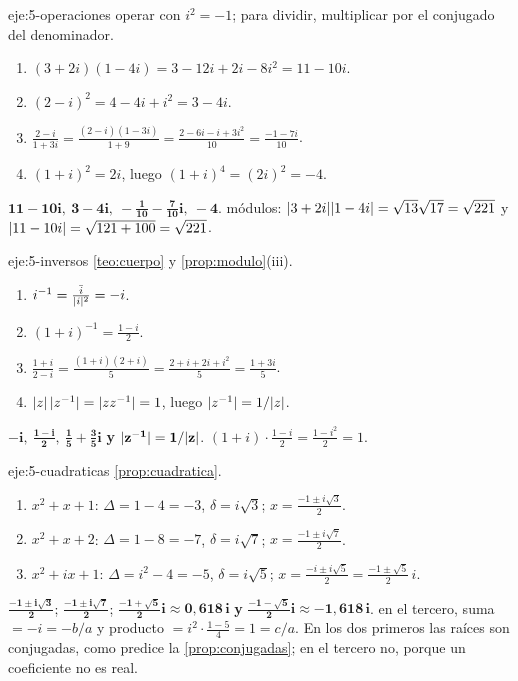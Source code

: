 \begin{solucion}{eje:5-operaciones}
\planteamiento operar con $i^{2}=-1$; para dividir, multiplicar por el conjugado del denominador.
\pasos
\begin{enumerate}[label=\arabic*.]
  \item $(3+2i)(1-4i)=3-12i+2i-8i^{2}=11-10i$.
  \item $(2-i)^{2}=4-4i+i^{2}=3-4i$.
  \item $\frac{2-i}{1+3i}=\frac{(2-i)(1-3i)}{1+9}=\frac{2-6i-i+3i^{2}}{10}=\frac{-1-7i}{10}$.
  \item $(1+i)^{2}=2i$, luego $(1+i)^{4}=(2i)^{2}=-4$.
\end{enumerate}
\resultado $\mathbf{11-10i,\ 3-4i,\ -\frac{1}{10}-\frac{7}{10}i,\ -4}$.
\comprobacion módulos: $\lvert3+2i\rvert\lvert1-4i\rvert=\sqrt{13}\sqrt{17}=\sqrt{221}$ y $\lvert11-10i\rvert=\sqrt{121+100}=\sqrt{221}$.
\end{solucion}

\begin{solucion}{eje:5-inversos}
\planteamiento \cref{teo:cuerpo} y \cref{prop:modulo}(iii).
\pasos
\begin{enumerate}[label=\arabic*.]
  \item $i^{-1}=\frac{\bar i}{\lvert i\rvert^{2}}=-i$.
  \item $(1+i)^{-1}=\frac{1-i}{2}$.
  \item $\frac{1+i}{2-i}=\frac{(1+i)(2+i)}{5}=\frac{2+i+2i+i^{2}}{5}=\frac{1+3i}{5}$.
  \item $\lvert z\rvert\,\lvert z^{-1}\rvert=\lvert zz^{-1}\rvert=1$, luego $\lvert z^{-1}\rvert=1/\lvert z\rvert$.
\end{enumerate}
\resultado $\mathbf{-i,\ \frac{1-i}{2},\ \frac15+\frac35i}$ \textbf{y} $\mathbf{\lvert z^{-1}\rvert=1/\lvert z\rvert}$.
\comprobacion $(1+i)\cdot\frac{1-i}{2}=\frac{1-i^{2}}{2}=1$.
\end{solucion}

\begin{solucion}{eje:5-cuadraticas}
\planteamiento \cref{prop:cuadratica}.
\pasos
\begin{enumerate}[label=\arabic*.]
  \item $x^{2}+x+1$: $\Delta=1-4=-3$, $\delta=i\sqrt3$; $x=\frac{-1\pm i\sqrt3}{2}$.
  \item $x^{2}+x+2$: $\Delta=1-8=-7$, $\delta=i\sqrt7$; $x=\frac{-1\pm i\sqrt7}{2}$.
  \item $x^{2}+ix+1$: $\Delta=i^{2}-4=-5$, $\delta=i\sqrt5$; $x=\frac{-i\pm i\sqrt5}{2}=\frac{-1\pm\sqrt5}{2}\,i$.
\end{enumerate}
\resultado $\mathbf{\frac{-1\pm i\sqrt3}{2}}$; $\mathbf{\frac{-1\pm i\sqrt7}{2}}$; $\mathbf{\frac{-1+\sqrt5}{2}i\approx0{,}618\,i}$ \textbf{y} $\mathbf{\frac{-1-\sqrt5}{2}i\approx-1{,}618\,i}$.
\comprobacion en el tercero, suma $=-i=-b/a$ y producto $=i^{2}\cdot\frac{1-5}{4}=1=c/a$. En los dos primeros las raíces son conjugadas, como predice la \cref{prop:conjugadas}; en el tercero no, porque un coeficiente no es real.
\end{solucion}

